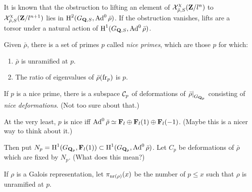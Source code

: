 It is known that the obstruction to lifting an element of 
$\mathcal{X}_{\bar\rho,S}^\chi(\mathbf{Z}/l^n)$ to $\mathcal{X}_{\bar\rho,S}^\chi(\mathbf{Z}/l^{n+1})$ lies 
in $\operatorname{H}^2(G_{\mathbf{Q},S},\operatorname{Ad}^0\bar\rho)$. If the obstruction vanishes, lifts are a
torsor under a natural action of $\operatorname{H}^1(G_{\mathbf{Q},S},\operatorname{Ad}^0\bar\rho)$. 

Given $\bar\rho$, there is a set of primes $p$ called \emph{nice primes}, which 
are those $p$ for which:
\begin{enumerate}
\item
$\bar\rho$ is unramified at $p$.

\item
The ratio of eigenvalues of $\bar\rho(\mathrm{fr}_p)$ is $p$. 
\end{enumerate}
If $p$ is a nice prime, there is a subspace $\mathcal{C}_p$ of deformations of 
$\left.\bar\rho\right|_{G_{\mathbf{Q}_p}}$ consisting of \emph{nice deformations}. 
(Not too sure about that.)

At the very least, $p$ is nice iff 
$\operatorname{Ad}^0 \bar\rho\simeq \mathbf{F}_l\oplus \mathbf{F}_l(1)\oplus \mathbf{F}_l(-1)$. (Maybe this is a 
nicer way to think about it.)

Then put $N_p = \operatorname{H}^1(G_{\mathbf{Q}_p},\mathbf{F}_l(1))\subset \operatorname{H}^1(G_{\mathbf{Q}_p},\operatorname{Ad}^0\bar\rho)$. 
Let $C_p$ be deformations of $\bar\rho$ which are fixed by $N_p$. (What does 
this mean?)





If $\rho$ is a Galois representation, let $\pi_{\mathrm{nr}(\rho)}(x)$ be the number of 
$p\leqslant x$ such that $\rho$ is unramified at $p$. 

